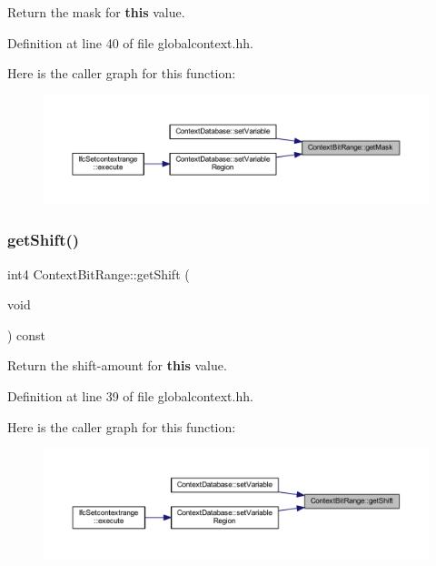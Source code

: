 Return the mask for {\bfseries{this}} value. 



Definition at line 40 of file globalcontext.\+hh.

Here is the caller graph for this function\+:
\nopagebreak
\begin{figure}[H]
\begin{center}
\leavevmode
\includegraphics[width=350pt]{class_context_bit_range_a69aa9a59ac5d327aa1d06b11b253e6a0_icgraph}
\end{center}
\end{figure}
\mbox{\label{class_context_bit_range_a8704ad410eb4093ef6b0c89479e1928a}} 
\subsubsection{\texorpdfstring{getShift()}{getShift()}}
{\footnotesize\ttfamily int4 Context\+Bit\+Range\+::get\+Shift (\begin{DoxyParamCaption}\item[{void}]{ }\end{DoxyParamCaption}) const\hspace{0.3cm}{\ttfamily [inline]}}



Return the shift-\/amount for {\bfseries{this}} value. 



Definition at line 39 of file globalcontext.\+hh.

Here is the caller graph for this function\+:
\nopagebreak
\begin{figure}[H]
\begin{center}
\leavevmode
\includegraphics[width=350pt]{class_context_bit_range_a8704ad410eb4093ef6b0c89479e1928a_icgraph}
\end{center}
\end{figure}
\mbox{\label{class_context_bit_range_a1086e19201eadfc91d14a589d07edab9}} 
